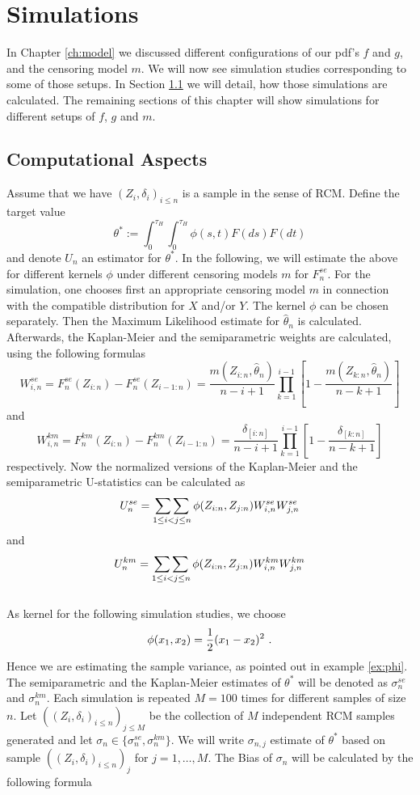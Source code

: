 \chapter{Simulations} \label{ch:simulation}

In Chapter \ref{ch:model} we discussed different configurations of our pdf's $f$ and $g$, and the censoring model $m$. We will now see simulation studies corresponding to some of those setups. In Section \ref{sec: computational_aspects} we will detail, how those simulations are calculated. The remaining sections of this chapter will show simulations for different setups of $f$, $g$ and $m$.

\section{Computational Aspects}\label{sec: computational_aspects}
Assume that we have $(Z_i, \delta_i)_{i\leq n}$ is a sample in the sense of RCM. Define the target value 
$$\theta^* := \int_{0}^{\tau_H}\int_{0}^{\tau_H} \phi(s,t) F(ds)F(dt)$$
and denote $U_n$ an estimator for $\theta^*$. In the following, we will estimate the above for different kernels $\phi$ under different censoring models $m$ for $F_n^{se}$. For the simulation, one chooses first an appropriate censoring model $m$ in connection with the compatible distribution for $X$ and/or $Y$. The kernel $\phi$ can be chosen separately. Then the Maximum Likelihood estimate for $\hat\theta_n$ is calculated. Afterwards, the Kaplan-Meier and the semiparametric weights are calculated, using the following formulas
$$W_{i,n}^{se} = F_n^{se}(Z_{i:n}) - F_n^{se}(Z_{i-1:n}) = \frac{m(Z_{i:n},\hat\theta_n)}{n-i+1} \prod\limits_{k=1}^{i-1}\left[1-\frac{m(Z_{k:n},\hat\theta_n)}{n-k+1}\right]$$
and 
$$W_{i,n}^{km} = F_n^{km}(Z_{i:n}) - F_n^{km}(Z_{i-1:n}) = \frac{\delta_{[i:n]}}{n-i+1} \prod\limits_{k=1}^{i-1}\left[1-\frac{\delta_{[k:n]}}{n-k+1}\right]$$
respectively. Now the normalized versions of the Kaplan-Meier and the semiparametric U-statistics can be calculated as
$$U_n^{se} = \mathop{\sum\sum}\limits_{1\leq i < j \leq n} \phi(Z_{i:n}, Z_{j:n}) W_{i,n}^{se} W_{j,n}^{se}$$
and 
$$U_n^{km} = \mathop{\sum\sum}\limits_{1\leq i < j \leq n} \phi(Z_{i:n}, Z_{j:n}) W_{i,n}^{km} W_{j,n}^{km}$$
\\
As kernel for the following simulation studies, we choose 
$$\phi(x_1,x_2) = \frac{1}{2} (x_1 - x_2)^2\textrm{ .}$$
Hence we are estimating the sample variance, as pointed out in example \ref{ex:phi}. The semiparametric and the Kaplan-Meier estimates of $\theta^*$ will be denoted as $\sigma_{n}^{se}$ and $\sigma_{n}^{km}$. Each simulation is repeated $M = 100$ times for different samples of size $n$. Let $((Z_i, \delta_i)_{i\leq n})_{j\leq M}$ be the collection of $M$ independent RCM samples generated and let $\sigma_n \in \{\sigma_n^{se}, \sigma_n^{km}\}$. We will write $\sigma_{n,j}$ estimate of $\theta^*$ based on sample $((Z_i, \delta_i)_{i\leq n})_j$ for $j=1,\dots,M$. The Bias of $\sigma_n$ will be calculated by the following formula
